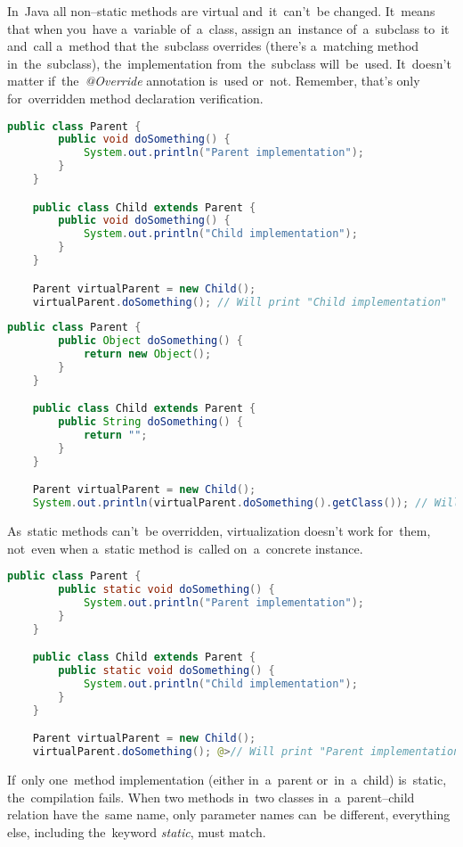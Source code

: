 \label{javavirtualmethods}
In~Java all non--static methods are virtual and~it~can't~be changed.
It~means that when you~have a~variable of~a~class, assign an~instance of~a~subclass to~it and~call a~method that the~subclass overrides (there's a~matching method in~the~subclass), the~implementation from~the~subclass will~be~used.
It~doesn't matter if~the~\textit{@Override} annotation is~used or~not.
Remember, that's only for~overridden method declaration verification.

\begin{lstlisting}[language=Java]
    public class Parent {
        public void doSomething() {
            System.out.println("Parent implementation");
        }
    }

    public class Child extends Parent {
        public void doSomething() {
            System.out.println("Child implementation");
        }
    }

    Parent virtualParent = new Child();
    virtualParent.doSomething(); // Will print "Child implementation"
\end{lstlisting}

\begin{lstlisting}[language=Java]
    public class Parent {
        public Object doSomething() {
            return new Object();
        }
    }

    public class Child extends Parent {
        public String doSomething() {
            return "";
        }
    }

    Parent virtualParent = new Child();
    System.out.println(virtualParent.doSomething().getClass()); // Will print "java.lang.String"
\end{lstlisting}

\warning As~static methods can't~be overridden, virtualization doesn't work for~them, not~even when a~static method is~called on~a~concrete instance.

\example
\begin{lstlisting}[language=Java]
    public class Parent {
        public static void doSomething() {
            System.out.println("Parent implementation");
        }
    }

    public class Child extends Parent {
        public static void doSomething() {
            System.out.println("Child implementation");
        }
    }

    Parent virtualParent = new Child();
    virtualParent.doSomething(); @>// Will print "Parent implementation"
\end{lstlisting}

\note If~only one~method implementation (either in~a~parent or~in~a~child) is~static, the~compilation fails.
When two methods in~two classes in~a~parent--child relation have the~same name, only parameter names can~be different, everything else, including the~keyword \textit{static}, must match.
